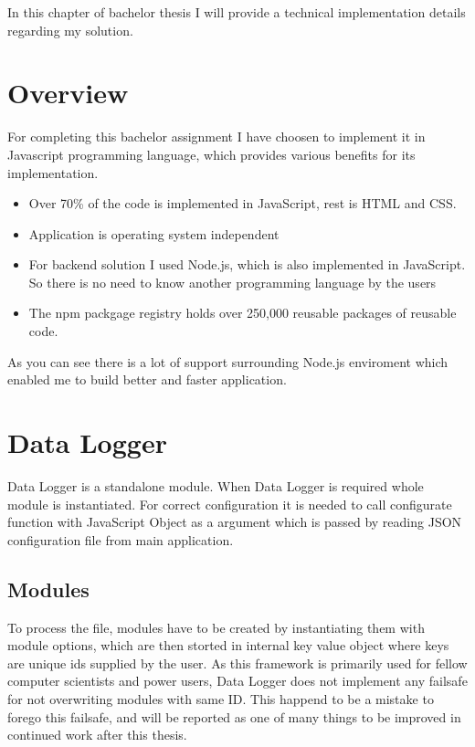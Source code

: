 In this chapter of bachelor thesis I will provide a technical implementation details regarding my solution.
\section{Overview} %
\label{sec:overview}
For completing this bachelor assignment I have choosen to implement it in Javascript programming language, which provides various benefits for its implementation.
\begin{itemize}
\item Over 70\% of the code is implemented in JavaScript, rest is HTML and CSS.
\item Application is operating system independent
\item For backend solution I used Node.js, which is also implemented in JavaScript. So there is no need to know another programming language by the users
\item The npm packgage registry holds over 250,000 reusable packages of reusable code.
\end{itemize}
As you can see there is a lot of support surrounding Node.js enviroment which enabled me to build better and faster application.

\section{Data Logger} %
\label{sec:Data Logger}
Data Logger is a standalone module. When Data Logger is required whole module is instantiated. For correct configuration it is needed to call configurate function with JavaScript Object as a argument which is passed by reading JSON configuration file from main application.
\subsection{Modules} %
\label{sub:modules}
To process the file, modules have to be created by instantiating them with module options, which are then storted in internal key value object where keys are unique ids supplied by the user. As this framework is primarily used for fellow computer scientists and power users, Data Logger does not implement any failsafe for not overwriting modules with same ID. This happend to be a mistake to forego this failsafe, and will be reported as one of many things to be improved in continued work after this thesis.

